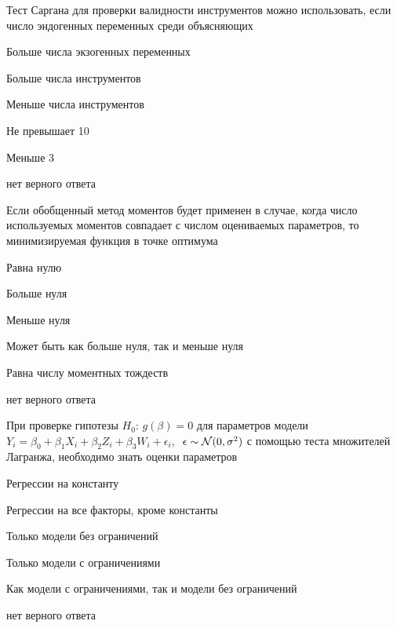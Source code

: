 \begin{question}
Тест Саргана для проверки валидности инструментов можно использовать, 
  если число эндогенных переменных среди объясняющих
\begin{answerlist}
\item Больше числа экзогенных переменных
\item Больше числа инструментов
\item Меньше числа инструментов
\item Не превышает 10
\item Меньше 3
\item нет верного ответа
\end{answerlist}
\end{question}


\begin{question}
  Если обобщенный метод моментов будет применен в случае, когда число используемых моментов 
  совпадает с числом оцениваемых параметров, то минимизируемая функция в точке оптимума 
\begin{answerlist}
\item Равна нулю
\item Больше нуля
\item Меньше нуля
\item Может быть как больше нуля, так и меньше нуля
\item Равна числу моментных тождеств
\item нет верного ответа
\end{answerlist}
\end{question}



\begin{question}
При проверке гипотезы \( H_0\): \(g(\beta)=0 \) 
для параметров модели \( Y_i=\beta_0+\beta_1 X_{i} + \beta_2 Z_i + \beta_3 W_i + \epsilon_i\), 
\(\epsilon \sim \mathcal{N}(0,\sigma^2) \) 
с помощью теста множителей Лагранжа, необходимо знать оценки параметров
  \begin{answerlist}
  \item Регрессии на константу   
  \item Регрессии на все факторы, кроме константы   
  \item Только модели без ограничений
  \item Только модели с ограничениями
  \item Как модели с ограничениями, так и модели без ограничений 
  \item нет верного ответа
\end{answerlist}
  \end{question}


